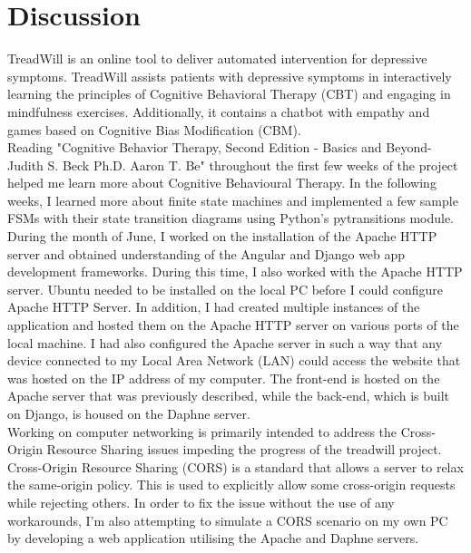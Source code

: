 \section{Discussion}
\normalsize{
TreadWill is an online tool to deliver automated intervention for depressive symptoms. TreadWill assists patients with depressive symptoms in interactively learning the principles of Cognitive Behavioral Therapy (CBT) and engaging in mindfulness exercises. Additionally, it contains a chatbot with empathy and games based on Cognitive Bias Modification (CBM).\cite{Ghosh2021.11.24.21266799}\\
Reading "Cognitive Behavior Therapy, Second Edition - Basics and Beyond-Judith S. Beck Ph.D. Aaron T. Be"\cite{beck2011cognitive} throughout the first few weeks of the project helped me learn more about Cognitive Behavioural Therapy. In the following weeks, I learned more about finite state machines and implemented a few sample FSMs with their state transition diagrams using Python's pytransitions module.\\

During the month of June, I worked on the installation of the Apache HTTP server and obtained understanding of the Angular and Django web app development frameworks. During this time, I also worked with the Apache HTTP server. Ubuntu needed to be installed on the local PC before I could configure Apache HTTP Server. In addition, I had created multiple instances of the application and hosted them on the Apache HTTP server on various ports of the local machine. I had also configured the Apache server in such a way that any device connected to my Local Area Network (LAN) could access the website that was hosted on the IP address of my computer. The front-end is hosted on the Apache server that was previously described, while the back-end, which is built on Django, is housed on the Daphne server.\\

Working on computer networking is primarily intended to address the Cross-Origin Resource Sharing issues impeding the progress of the treadwill project. Cross-Origin Resource Sharing (CORS) is a standard that allows a server to relax the same-origin policy. This is used to explicitly allow some cross-origin requests while rejecting others.\cite{cors-mozilla} In order to fix the issue without the use of any workarounds, I'm also attempting to simulate a CORS scenario on my own PC by developing a web application utilising the Apache and Daphne servers.\\
}
\clearpage

